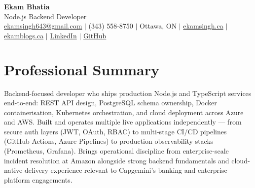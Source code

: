 \documentclass[11pt,a4paper]{article}
\begin{document}
\begin{center}
    {\LARGE \textbf{Ekam Bhatia}} \\
    \vspace{2pt}
    {\normalsize Node.js Backend Developer} \\
    \vspace{4pt}
    \small
    \href{mailto:ekamsingh643@gmail.com}{ekamsingh643@gmail.com} $|$
    (343) 558-8750 $|$ Ottawa, ON $|$
    \href{https://www.ekamsingh.ca}{ekamsingh.ca} $|$
    \href{https://www.ekamblogs.ca}{ekamblogs.ca} $|$
    \href{https://www.linkedin.com/in/ekam-bhatia-335840168}{LinkedIn} $|$
    \href{https://github.com/bhat0155}{GitHub}
\end{center}

\section{Professional Summary}
Backend-focused developer who ships production Node.js and TypeScript services end-to-end: REST API design, PostgreSQL schema ownership, Docker containerisation, Kubernetes orchestration, and cloud deployment across Azure and AWS. Built and operates multiple live applications independently --- from secure auth layers (JWT, OAuth, RBAC) to multi-stage CI/CD pipelines (GitHub Actions, Azure Pipelines) to production observability stacks (Prometheus, Grafana). Brings operational discipline from enterprise-scale incident resolution at Amazon alongside strong backend fundamentals and cloud-native delivery experience relevant to Capgemini's banking and enterprise platform engagements.

\end{document}
